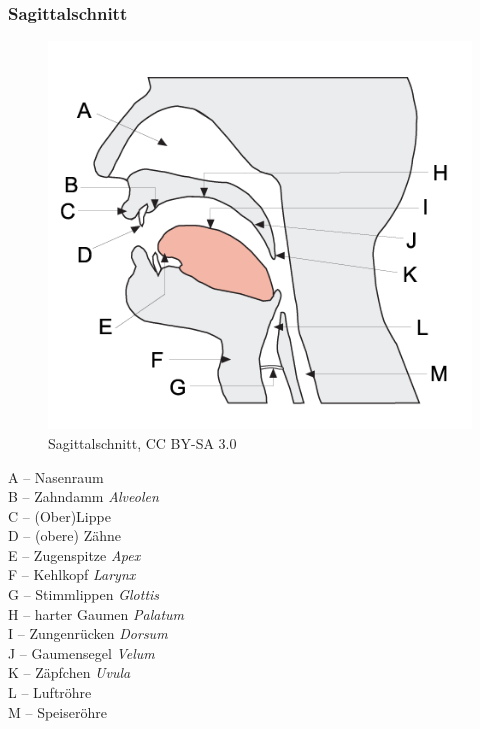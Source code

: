 
\begin{frame}
\frametitle{Sagittalschnitt}

\begin{minipage}{0.48\textwidth}
	\begin{figure}
	\centering
	\includegraphics[scale=0.32]{material/04phonoatonomy}
	\caption{Sagittalschnitt, CC BY-SA 3.0}
	\end{figure}
\end{minipage}\hfill
\begin{minipage}{0.4\textwidth}
	A -- Nasenraum\\
	B -- Zahndamm \emph{Alveolen}\\
	C -- (Ober)Lippe \\
	D -- (obere) Zähne\\
	E -- Zugenspitze \emph{Apex}\\
	F -- Kehlkopf \emph{Larynx}\\
	G -- Stimmlippen \emph{Glottis}\\
	H -- harter Gaumen \emph{Palatum}\\
	I -- Zungenrücken \emph{Dorsum}\\
	J -- Gaumensegel \emph{Velum}\\
	K -- Zäpfchen \emph{Uvula}\\
	L -- Luftröhre\\ 
	M -- Speiseröhre
\end{minipage}
	
%		
	
\end{frame}



